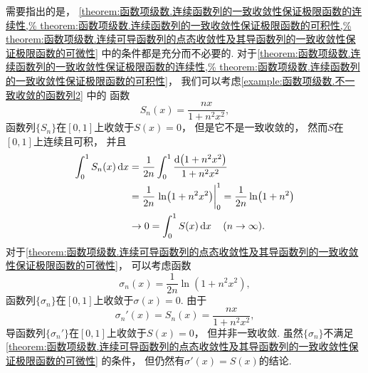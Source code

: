 需要指出的是，
\cref{theorem:函数项级数.连续函数列的一致收敛性保证极限函数的连续性,%
theorem:函数项级数.连续函数列的一致收敛性保证极限函数的可积性,%
theorem:函数项级数.连续可导函数列的点态收敛性及其导函数列的一致收敛性保证极限函数的可微性}
中的条件都是充分而不必要的.
对于\cref{theorem:函数项级数.连续函数列的一致收敛性保证极限函数的连续性,%
theorem:函数项级数.连续函数列的一致收敛性保证极限函数的可积性}，
我们可以考虑\cref{example:函数项级数.不一致收敛的函数列2} 中的
函数\[
	S_n(x) = \frac{nx}{1+n^2x^2},
\]
函数列\(\{S_n\}\)在\([0,1]\)上收敛于\(S(x)=0\)，
但是它不是一致收敛的，
然而\(S\)在\([0,1]\)上连续且可积，
并且\begin{align*}
	\int_0^1 S_n(x) \dd{x}
	&= \frac1{2n} \int_0^1 \frac{\dd(1+n^2x^2)}{1+n^2x^2} \\
	&= \frac1{2n} \eval{\ln(1+n^2x^2)}_0^1
	= \frac1{2n} \ln(1+n^2) \\
	&\to 0 = \int_0^1 S(x) \dd{x}
	\quad(n\to\infty).
\end{align*}
对于\cref{theorem:函数项级数.连续可导函数列的点态收敛性及其导函数列的一致收敛性保证极限函数的可微性}，
可以考虑函数\[
	\sigma_n(x) = \frac1{2n} \ln(1+n^2x^2),
\]
函数列\(\{\sigma_n\}\)在\([0,1]\)上收敛于\(\sigma(x)=0\).
由于\[
	\sigma_n'(x)
	= S_n(x)
	= \frac{nx}{1+n^2x^2},
\]
导函数列\(\{\sigma_n'\}\)在\([0,1]\)上收敛于\(S(x)=0\)，
但并非一致收敛.
虽然\(\{\sigma_n\}\)不满足\cref{theorem:函数项级数.连续可导函数列的点态收敛性及其导函数列的一致收敛性保证极限函数的可微性} 的条件，
但仍然有\(\sigma'(x) = S(x)\)的结论.

